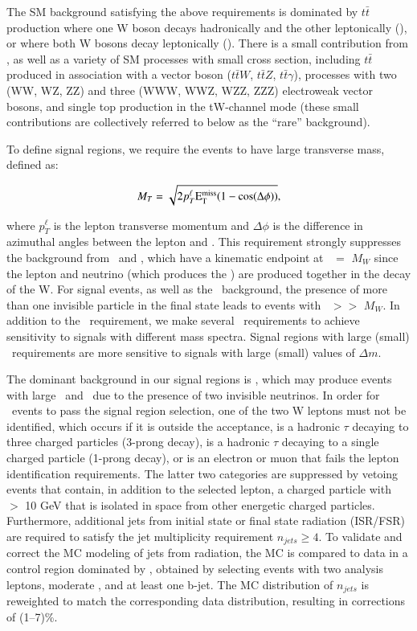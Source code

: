 The SM background satisfying the above requirements is dominated by $t\bar{t}$ production where
one W boson decays hadronically and the other leptonically (\ttljets), or where both W bosons decay leptonically (\ttll).
There is a small contribution from \wjets, as well as a variety of SM
processes with small cross section, including $t\bar{t}$ produced in association with a vector boson
($t\bar{t}W$, $t\bar{t}Z$, $t\bar{t}\gamma$), processes with two (WW, WZ, ZZ) and three (WWW, WWZ, WZZ, ZZZ) electroweak
vector bosons, and single top production in the tW-channel mode (these small contributions are collectively
referred to below as the ``rare'' background).

To define signal regions, we require the events to have large transverse mass, defined as:

\begin{equation}
M_T = \sqrt{ 2 p_{T}^{\ell} \rm{E_{T}^{miss}} ( 1-cos(\Delta\phi))},
\end{equation}

where $p_{T}^{\ell}$ is the lepton transverse momentum and $\Delta\phi$ is the difference in azimuthal angles between the lepton
and \met. This requirement strongly suppresses the background from \ttljets\ and \wjets, which have a kinematic endpoint
at \mt\ $=$ $M_W$ since the lepton and neutrino (which produces the \met) are produced together in the decay of the W.
For signal events, as well as the \ttll\ background, the presence of more than one invisible
particle in the final state leads to events with \mt\ $>>$ $M_W$. 
In addition to the \mt\ requirement, we make several 
\met\ requirements to achieve sensitivity to signals with different mass spectra.
Signal regions with large (small) \met\ requirements are more sensitive to signals with large (small) values of $\Delta m$.

The dominant background in our signal regions is \ttll, which may produce events with large \met\ and \mt\ due to the presence of
two invisible neutrinos. In order for \ttll\ events to pass the signal region selection, one of the two W leptons must not be identified,
which occurs if it is outside the acceptance, is a hadronic $\tau$ decaying to three charged particles (3-prong decay),
is a hadronic $\tau$ decaying to a single charged particle (1-prong decay), or is an electron or muon that fails the lepton identification
requirements. The latter two categories are suppressed by vetoing events that contain, in addition to the selected lepton, 
a charged particle with \pt\ $>$ 10 GeV that is isolated in space from other energetic charged particles. Furthermore, additional jets 
from initial state or final state radiation (ISR/FSR) are required to satisfy the jet multiplicity requirement $n_{jets}\geq4$. 
To validate and correct the MC modeling of jets from radiation, the MC is compared to data in a control region dominated by \ttll, obtained 
by selecting events with two analysis leptons, moderate \met, and at least one b-jet. The MC distribution of $n_{jets}$ is reweighted to 
match the corresponding data distribution, resulting in corrections of (1--7)\%.

